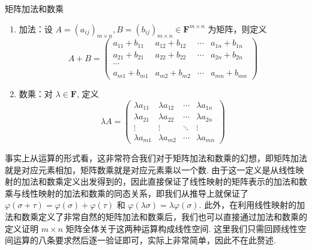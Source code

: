 

\begin{definition}{矩阵加法和数乘}{}
    \begin{enumerate}
        \item 加法：设 $A = (a_{ij})_{m\times n}, B = (b_{ij})_{m\times n} \in \mathbf{F}^{m\times n}$ 为矩阵，则定义
        \[
            A + B = \begin{pmatrix}
                a_{11} + b_{11} & a_{12} + b_{12} & \cdots & a_{1n} + b_{1n} \\
                a_{21} + b_{21} & a_{22} + b_{22} & \cdots & a_{2n} + b_{2n} \\
                \cdots\\
                a_{m1} + b_{m1} & a_{m2} + b_{m2} & \cdots & a_{mn} + b_{mn}
            \end{pmatrix}
        \]
        \item 数乘：对 $\lambda\in\mathbf{F}$, 定义
        \[
            \lambda A = \begin{pmatrix}
                \lambda a_{11} & \lambda a_{12} & \cdots & \lambda a_{1n} \\
                \lambda a_{21} & \lambda a_{22} & \cdots & \lambda a_{2n} \\
                \vdots & \vdots & \ddots & \vdots \\
                \lambda a_{m1} & \lambda a_{m2} & \cdots & \lambda a_{mn}
            \end{pmatrix}
        \]
    \end{enumerate}
\end{definition}

事实上从运算的形式看，这非常符合我们对于矩阵加法和数乘的幻想，即矩阵加法就是对应元素相加，矩阵数乘就是对应元素乘以一个数. 由于这一定义是从线性映射的加法和数乘定义出发得到的，因此直接保证了线性映射的矩阵表示的加法和数乘与线性映射的加法和数乘的同态关系，即我们从推导上就保证了 $\varphi(\sigma + \tau) = \varphi(\sigma) + \varphi(\tau)$ 和 $\varphi(\lambda \sigma) = \lambda \varphi(\sigma)$. 此外，在利用线性映射的加法和数乘定义了非常自然的矩阵加法和数乘后，我们也可以直接通过加法和数乘的定义证明 $m \times n$ 矩阵全体关于这两种运算构成线性空间. 这里我们只需回顾线性空间运算的八条要求然后逐一验证即可，实际上非常简单，因此不在此赘述.

